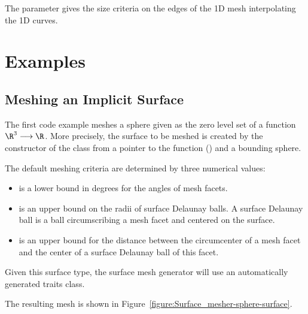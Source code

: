 The parameter  gives the size criteria on the edges of
the 1D mesh interpolating the 1D curves.

\def\ccLongParamLayout{\ccFalse}

\section{Examples}
\label{SurfaceMesher_section_example}


\subsection{Meshing an Implicit Surface}

The first code example meshes a sphere 
given as the zero level set of a function $\R^3 \longrightarrow \R$.
More precisely, 
the surface to be meshed is created 
by the constructor
of the class 
from a pointer to the function ()
and a bounding sphere.

The default meshing criteria are determined  by three numerical
values: 
\begin{itemize}
\item {} is a lower bound in degrees for the angles 
     of mesh facets.
\item {} is an upper bound on the radii of surface Delaunay
balls. A surface Delaunay ball is a ball circumscribing a mesh facet
and centered on the surface. 
\item {} is an upper bound for the distance 
between the circumcenter of a mesh facet and the center of a surface
Delaunay ball of this facet.
\end{itemize}

Given this surface type, the surface mesh generator will use
an automatically generated traits class.

The resulting mesh is shown in 
Figure~\ref{figure:Surface_mesher-sphere-surface}.

